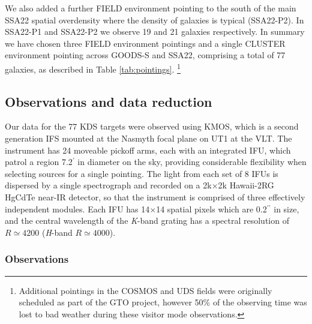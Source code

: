 \documentclass[fleqn,usenatbib]{mn2e}
\begin{document}
We also added a further FIELD environment pointing to the south of the main SSA22 spatial overdensity where the density of galaxies is typical (SSA22-P2).
In SSA22-P1 and SSA22-P2 we observe 19 and 21 galaxies respectively.
In summary we have chosen three FIELD environment pointings and a single CLUSTER environment pointing across GOODS-S and SSA22, comprising a total of 77 galaxies, as described in Table \ref{tab:pointings}. \footnote{Additional pointings in the COSMOS and UDS fields were originally scheduled as part of the GTO project, however 50$\%$ of the observing time was lost to bad weather during these visitor mode observations.}

\subsection{Observations and data reduction}\label{subsubsec:observations_and_dr}

Our data for the 77 KDS targets were observed using KMOS, which is a second generation IFS mounted at the Nasmyth focal plane on UT1 at the VLT.
The instrument has 24 moveable pickoff arms, each with an integrated IFU, which patrol a region 7.2$^{\prime}$ in diameter on the sky, providing considerable flexibility when selecting sources for a single pointing.
The light from each set of 8 IFUs is dispersed by a single spectrograph and recorded on a 2k$\times$2k Hawaii-2RG HgCdTe near-IR detector, so that the instrument is comprised of three effectively independent modules.
Each IFU has 14$\times$14 spatial pixels which are 0.2$^{\prime\prime}$ in size, and the central wavelength of the {\it K}-band grating has a spectral resolution of $R\simeq4200$ ({\it H}-band $R\simeq4000$).
\subsubsection{Observations}\label{subsubsec:Obs}
\end{document}
